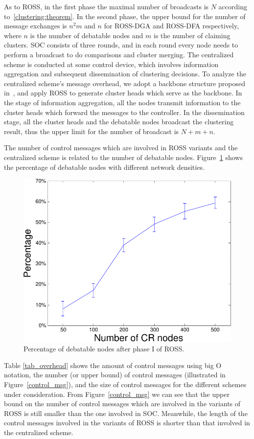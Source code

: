 \documentclass[times]{ettauth}
\theoremstyle{mytheoremstyle}
\theoremstyle{mytheoremstyle}
\theoremstyle{mytheoremstyle}
\begin{document}
As to ROSS, in the first phase the maximal number of broadcasts is $N$ according to~\ref{clustering:theorem}.
In the second phase, the upper bound for the number of message exchanges is $n^2m$ and $n$ for ROSS-DGA and ROSS-DFA respectively, where $n$ is the number of debatable nodes and $m$ is the number of claiming clusters.
SOC consists of three rounds, and in each round every node needs to perform a broadcast to do comparisons and cluster merging.
The centralized scheme is conducted at some control device, which involves information aggregation and subsequent dissemination of clustering decisions.
To analyze the centralized scheme's message overhead, we adopt a backbone structure proposed in~\cite{Efficient_broadcasting_gathering_adhoc}, and apply ROSS to generate cluster heads which serve as the backbone.
In the stage of information aggregation, all the nodes transmit information to the cluster heads which forward the messages to the controller. 
In the dissemination stage, all the cluster heads and the debatable nodes broadcast the clustering result, thus the upper limit for the number of broadcast is $N+m+n$.

The number of control messages which are involved in ROSS variants and the centralized scheme is related to the number of debatable nodes.
Figure~\ref{percentage_overlapping_node} shows the percentage of debatable nodes with different network densities.
\begin{figure}[ht!]
  \centering
  \includegraphics[width=0.6\linewidth]{percentage_overlapping_node.pdf}
  \caption{Percentage of debatable nodes after phase I of ROSS.}
  \label{percentage_overlapping_node}
\end{figure}
%
Table \ref{tab_overhead} shows the amount of control messages using big O notation, the number (or upper bound) of control messages (illustrated in Figure~\ref{control_msg}), and the size of control messages for the different schemes under consideration.
From Figure~\ref{control_msg} we can see that the upper bound on the number of control messages which are involved in the variants of ROSS is still smaller than the one involved in SOC.
Meanwhile, the length of the control messages involved in the variants of ROSS is shorter than that involved in the centralized scheme.
\end{document}
